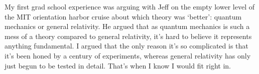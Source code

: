 My first grad school experience was arguing with Jeff on the empty lower level of the MIT orientation harbor cruise about which theory was `better': quantum mechanics or general relativity. He argued that as quantum mechanics is such a mess of a theory compared to general relativity, it's hard to believe it represents anything fundamental. I argued that the only reason it's so complicated is that it's been honed by a century of experiments, whereas general relativity has only just begun to be tested in detail. That's when I know I would fit right in.


